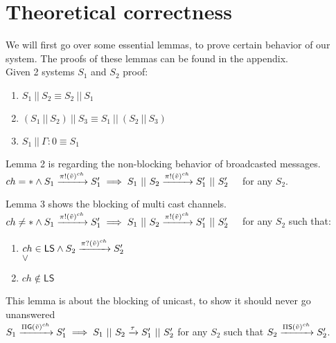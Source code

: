 \chapter{Theoretical correctness}
We will first go over some essential lemmas, to prove certain behavior of our system. The proofs of these lemmas can be found in the appendix.\\
Given 2 systems $S_1$ and $S_2$ proof:\\
\begin{lemma}
    \begin{enumerate}
    \item $S_1 \ || \ S_2 \equiv S_2\ ||\ S_1$
    \item $(S_1 \ ||\ S_2 )\ || \ S_3 \equiv S_1 \ ||\ (S_2 \ || \ S_3)$
    \item $S_1 \ || \ \Gamma : 0 \equiv S_1$
\end{enumerate}
\end{lemma}
\begin{lemma}
Lemma 2 is regarding the non-blocking behavior of broadcasted messages.\\ 
$ch=* \land S_1 \xrightarrow[]{\pi !(\Tilde{v})^{ch}}S_1' \implies S_1\ ||\ S_2 \xrightarrow[]{\pi !(\Tilde{v})^{ch}}S_1'\ ||\ S_2'\quad $ for any $S_2$.\\
\end{lemma}

\begin{lemma}
    Lemma 3 shows the blocking of multi cast channels.\\
$ch\not = * \land S_1 \xrightarrow[]{\pi !(\Tilde{v})^{ch}}S_1' \implies S_1\ ||\ S_2 \xrightarrow[]{\pi !(\Tilde{v})^{ch}}S_1'\ ||\ S_2'\quad$ for any $S_2$ such that:
\begin{enumerate}
    \item $ch \in \mathsf{LS} \land S_2 \xrightarrow[]{\pi ?(\Tilde{v})^{ch}}S_2'$\\
    $\lor$
    \item $ch \not \in \mathsf{LS}$
\end{enumerate}
\end{lemma}

\begin{lemma}
    This lemma is about the blocking of unicast, to show it should never go unanswered\\
$S_1 \xrightarrow[]{\Pi \mathsf{G} (\Tilde{v})^{ch}} S_1' \implies S_1 \ || \ S_2 \xrightarrow[]{\tau} S_1' \ || \ S_2'$ for any $S_2$ such that $S_2 \xrightarrow[]{\Pi \mathsf{S} (\Tilde{v})^{ch}} S_2'$. 
\end{lemma}


